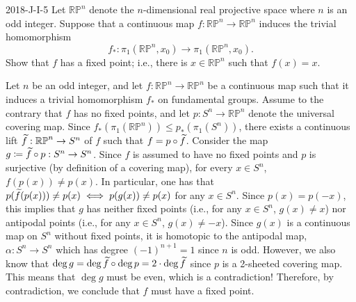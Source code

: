 \documentclass{article}
\begin{document}
	\begin{prb}{2018-J-I-5}
		Let $\mathbb{RP}^{n}$ denote the $n$-dimensional real projective space where $n$ is an odd integer. Suppose that a continuous map $f: \mathbb{RP}^{n} \to \mathbb{RP}^{n}$ induces the trivial homomorphism
		\begin{equation*}
			f_{\ast}: \pi_{1}(\mathbb{RP}^{n}, x_{0}) \to \pi_{1}(\mathbb{RP}^{n}, x_{0}). 
		\end{equation*}
		Show that $f$ has a fixed point; i.e., there is $x \in \mathbb{RP}^{n}$ such that $f(x) = x$. 
	\end{prb}
	Let $n$ be an odd integer, and let $f: \mathbb{RP}^{n} \to \mathbb{RP}^{n}$ be a continuous map such that it induces a trivial homomorphism $f_{\ast}$ on fundamental groups. Assume to the contrary that $f$ has no fixed points, and let $p: S^{n} \to \mathbb{RP}^{n}$ denote the universal covering map. Since $f_{\ast}(\pi_{1}(\mathbb{RP}^{n})) \leq p_{\ast}(\pi_{1}(S^{n}))$, there exists a continuous lift $\widetilde{f}: \mathbb{RP}^{n} \to S^{n}$ of $f$ such that $f = p \circ \widetilde{f}$. Consider the map $g \coloneqq \widetilde{f} \circ p: S^{n} \to S^{n}$. Since $f$ is assumed to have no fixed points and $p$ is surjective (by definition of a covering map), for every $x \in S^n$, $f(p(x)) \neq p(x)$. In particular, one has that $p(\widetilde{f}(p(x))) \neq p(x) \iff p(g(x)) \neq p(x)$ for any $x \in S^{n}$. Since $p(x) = p(-x)$, this implies that $g$ has neither fixed points (i.e., for any $x \in S^{n}$, $g(x) \neq x$) nor antipodal points (i.e., for any $x \in S^{n}$, $g(x) \neq -x$). Since $g(x)$ is a continuous map on $S^{n}$ without fixed points, it is homotopic to the antipodal map, $\alpha: S^{n} \to S^{n}$ which has degree $(-1)^{n + 1} = 1$ since $n$ is odd. However, we also know that $\deg{g} = \deg{\widetilde{f}} \circ \deg{p} = 2 \cdot \deg{\widetilde{f}}$ since $p$ is a 2-sheeted covering map. This means that $\deg{g}$ must be even, which is a contradiction! Therefore, by contradiction, we conclude that $f$ must have a fixed point. 
	
\end{document}
